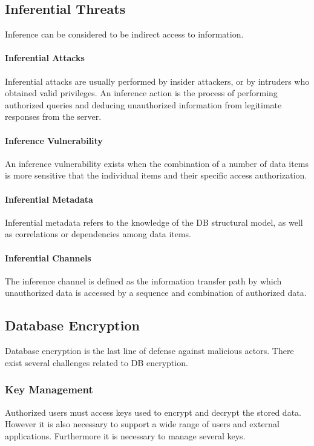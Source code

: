 \subsection{Inferential Threats}
Inference can be considered to be indirect access to information.

\paragraph{Inferential Attacks}
Inferential attacks are usually performed by insider attackers,
or by intruders who obtained valid privileges.
An inference action is the process of performing authorized queries and deducing unauthorized information from legitimate responses from the server.

\paragraph{Inference Vulnerability}
An inference vulnerability exists when the combination of a number of data items is more sensitive that the individual items and their specific access authorization.

\paragraph{Inferential Metadata}
Inferential metadata refers to the knowledge of the DB structural model,
as well as correlations or dependencies among data items.

\paragraph{Inferential Channels}
The inference channel is defined as the information transfer path by which unauthorized data is accessed by a sequence and combination of authorized data.

\subsection{Database Encryption}
Database encryption is the last line of defense against malicious actors.
There exist several challenges related to DB encryption.

\subsubsection{Key Management}
Authorized users must access keys used to encrypt and decrypt the stored data.
However it is also necessary to support a wide range of users and external applications.
Furthermore it is necessary to manage several keys.

